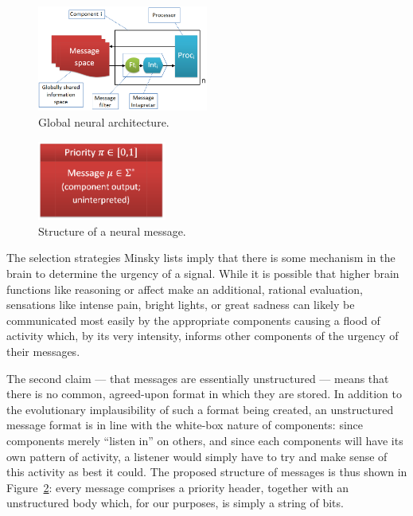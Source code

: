 \begin{figure}[t]
	\centering
	\includegraphics[width=0.5\textwidth]{Figs/global.png}
	\caption{Global neural architecture.}
	\label{fig:global}
\end{figure}

\begin{figure}[b]
	\centering
	\includegraphics[width=120pt]{Figs/message.png}
	\caption{Structure of a neural message.}
	\label{fig:message}
\end{figure}

The selection strategies Minsky lists imply that there is some mechanism in the brain to determine the urgency of a signal. While it is possible that higher brain functions like reasoning or affect make an additional, rational evaluation, sensations like intense pain, bright lights, or great sadness can likely be communicated most easily by the appropriate components causing a flood of activity which, by its very intensity, informs other components of the urgency of their messages.

The second claim --- that messages are essentially unstructured --- means that there is no common, agreed-upon format in which they are stored. In addition to the evolutionary implausibility of such a format being created, an unstructured message format is in line with the white-box nature of components: since components merely ``listen in'' on others, and since each components will have its own pattern of activity, a listener would simply have to try and make sense of this activity as best it could. The proposed structure of messages is thus shown in Figure~\ref{fig:message}: every message comprises a priority header, together with an unstructured body which, for our purposes, is simply a string of bits.

